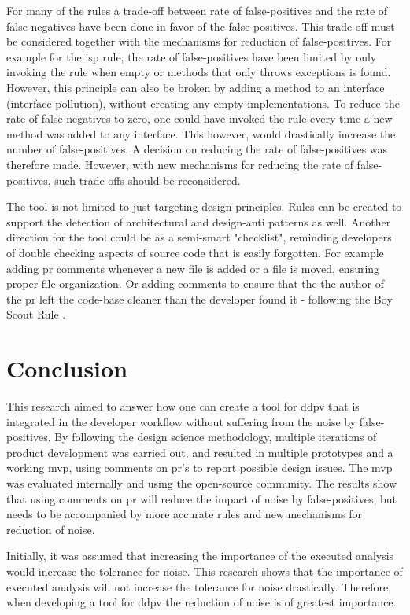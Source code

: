 \documentclass{report}
\begin{document}
For many of the rules a trade-off between rate of false-positives and the rate of false-negatives have been done in favor of the false-positives. This trade-off must be considered together with the mechanisms for reduction of false-positives. For example for the \gls{isp} rule, the rate of false-positives have been limited by only invoking the rule when empty or methods that only throws exceptions is found. However, this principle can also be broken by adding a method to an interface (interface pollution), without creating any empty implementations. To reduce the rate of false-negatives to zero, one could have invoked the rule every time a new method was added to any interface. This however, would drastically increase the number of false-positives. A decision on reducing the rate of false-positives was therefore made. However, with new mechanisms for reducing the rate of false-positives, such trade-offs should be reconsidered. 


The tool is not limited to just targeting design principles. Rules can be created to support the detection of architectural and design-anti patterns as well. Another direction for the tool could be as a semi-smart "checklist", reminding developers of double checking aspects of source code that is easily forgotten. For example adding \gls{pr} comments whenever a new file is added or a file is moved, ensuring proper file organization. Or adding comments to ensure that the the author of the \gls{pr} left the code-base cleaner than the developer found it - following the Boy Scout Rule \cite{boy-scout}.

\section{Conclusion}
\label{conclusion}

This research aimed to answer how one can create a tool for \gls{ddpv} that is integrated in the developer workflow without suffering from the noise by false-positives. By following the design science methodology, multiple iterations of product development was carried out, and resulted in multiple prototypes and a working \gls{mvp}, using comments on \gls{pr}'s to report possible design issues. The \gls{mvp} was evaluated internally and using the open-source community. The results show that using comments on \gls{pr} will reduce the impact of noise by false-positives, but needs to be accompanied by more accurate rules and new mechanisms for reduction of noise. 

Initially, it was assumed that increasing the importance of the executed analysis would increase the tolerance for noise. This research shows that the importance of executed analysis will not increase the tolerance for noise drastically. Therefore, when developing a tool for \gls{ddpv} the reduction of noise is of greatest importance. 
\end{document}

